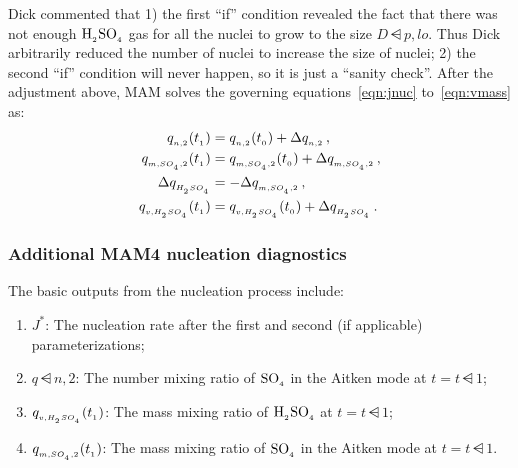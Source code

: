 Dick commented that 1) the first ``if'' condition revealed the fact that
there was not enough $\rm H_{_2}SO_{_4}$ gas for all the nuclei to grow to the size
$D\dsub{p,lo}$. Thus Dick arbitrarily reduced the number of nuclei to
increase the size of nuclei; 2) the second ``if'' condition will never
happen, so it is just a ``sanity check''. After the adjustment above,
MAM solves the governing equations~\eqref{eqn:jnuc} to~\eqref{eqn:vmass} as:
\begin{align}
q_{_{n,2}} (t_{_{1}}) &= q_{_{n,2}} (t_{_{0}}) + \Delta q_{_{n,2}} \,, \\
q_{_{m,SO_{_4},2}} (t_{_{1}}) &= q_{_{m,SO_{_4},2}} (t_{_{0}}) + \Delta q_{_{m,SO_{_4},2}} \,, \\
\Delta q_{_{H_{_2}SO_{_4}}} &= -\Delta q_{_{m,SO_{_4},2}} \,, \\
q_{_{v,H_{_2}SO_{_4}}} (t_{_{1}}) &= q_{_{v,H_{_2}SO_{_4}}} (t_{_{0}}) + \Delta q_{_{H_{_2}SO_{_4}}} \,.
\end{align}

\subsubsection{Additional MAM4 nucleation diagnostics} \label{output}
The basic outputs from the nucleation process include:
\begin{enumerate}
\item $J^*$: The nucleation rate after the first and second (if applicable) parameterizations;
\item $q\dsub{n,2}$: The number mixing ratio of $\rm SO_{_4}$ in the Aitken mode at $t = t\dsub1$;
\item $q_{_{v,H_{_2}SO_{_4}}} (t_{_{1}})$: The mass mixing ratio of $\rm H_{_2}SO_{_4}$ at $t = t\dsub1$;
\item $q_{_{m,SO_{_4},2}} (t_{_{1}})$: The mass mixing ratio of $\rm SO_{_4}$ in the Aitken mode at $t = t\dsub1$.
\end{enumerate}

